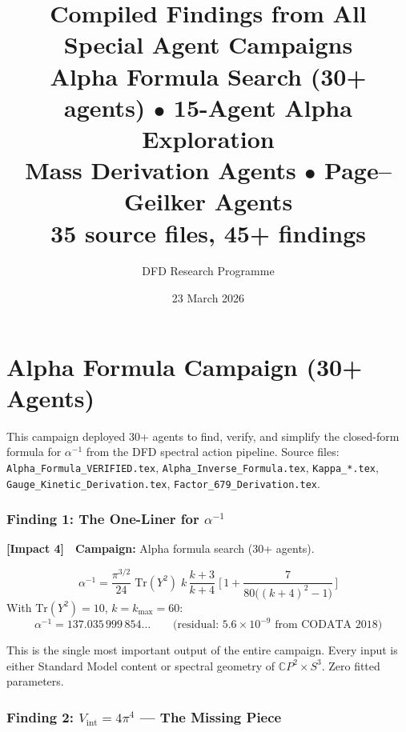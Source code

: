 \documentclass[11pt,a4paper]{article}
\title{\Huge Compiled Findings from All Special Agent Campaigns\\[12pt]
\Large Alpha Formula Search (30+ agents) $\bullet$ 15-Agent Alpha Exploration\\
Mass Derivation Agents $\bullet$ Page--Geilker Agents\\[12pt]
\normalsize 35 source files, 45+ findings}
\author{DFD Research Programme}
\date{23 March 2026}
\newcommand{\impactfour}{\textcolor{impact4}{\textbf{[Impact 4]}}}
\newcommand{\CP}{\mathbb{C}P}
\newcommand{\Tr}{\mathrm{Tr}}
\begin{document}
\maketitle
\tableofcontents
\newpage


\part{Alpha Formula Campaign (30+ Agents)}
\label{part:alpha}

This campaign deployed 30+ agents to find, verify, and simplify the
closed-form formula for $\alpha^{-1}$ from the DFD spectral action pipeline.
Source files: \texttt{Alpha\_Formula\_VERIFIED.tex},
\texttt{Alpha\_Inverse\_Formula.tex}, \texttt{Kappa\_*.tex},
\texttt{Gauge\_Kinetic\_Derivation.tex}, \texttt{Factor\_679\_Derivation.tex}.


\section{Finding 1: The One-Liner for $\alpha^{-1}$}
\label{sec:one-liner}

\impactfour\ \ \textbf{Campaign:} Alpha formula search (30+ agents).

\begin{tcolorbox}[colback=red!5!white, colframe=red!60!black,
  title=THE ONE-LINER]
\begin{equation}
\boxed{\;
\alpha^{-1}
= \frac{\pi^{3/2}}{24}\;\Tr(Y^2)\;
k\,\frac{k+3}{k+4}\;
\biggl[\,1 + \frac{7}{80\bigl((k+4)^2-1\bigr)}\,\biggr]
\;}
\end{equation}
With $\Tr(Y^2) = 10$, $k = k_{\max} = 60$:
\[
\alpha^{-1} = 137.035\,999\,854\ldots
\qquad\text{(residual: }5.6 \times 10^{-9}\text{ from CODATA 2018)}
\]
\end{tcolorbox}

\noindent
This is the single most important output of the entire campaign.
Every input is either Standard Model content or spectral geometry of
$\CP^2 \times S^3$. Zero fitted parameters.


\section{Finding 2: $V_{\mathrm{int}} = 4\pi^4$ --- The Missing Piece}
\label{sec:Vint}
\end{document}

